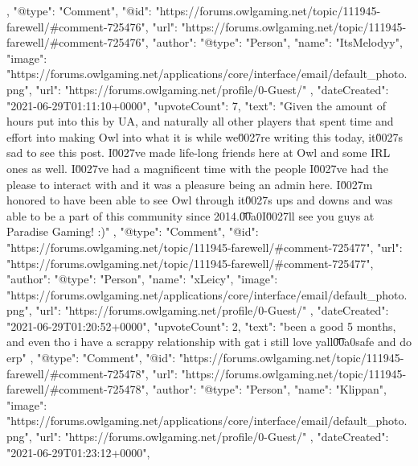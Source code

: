 {{        },
        {
            "@type": "Comment",
            "@id": "https://forums.owlgaming.net/topic/111945-farewell/#comment-725476",
            "url": "https://forums.owlgaming.net/topic/111945-farewell/#comment-725476",
            "author": {
                "@type": "Person",
                "name": "ItsMelodyy",
                "image": "https://forums.owlgaming.net/applications/core/interface/email/default_photo.png",
                "url": "https://forums.owlgaming.net/profile/0-Guest/"
            },
            "dateCreated": "2021-06-29T01:11:10+0000",
            "upvoteCount": 7,
            "text": "Given the amount of hours put into this by UA, and naturally all other players that spent time and effort into making Owl into what it is while we\u0027re writing this today, it\u0027s sad to see this post. I\u0027ve made life-long friends here at Owl and some IRL ones as well. I\u0027ve had a magnificent time with the people I\u0027ve had the please to interact with and it was a pleasure being an admin here. I\u0027m honored to have been able to see Owl through it\u0027s ups and downs and was able to be a part of this community since 2014.\n \n\n\n\t\u00a0\n \n\n\n\tHopefully I\u0027ll see you guys at Paradise Gaming! :)\n \n"
        },
        {
            "@type": "Comment",
            "@id": "https://forums.owlgaming.net/topic/111945-farewell/#comment-725477",
            "url": "https://forums.owlgaming.net/topic/111945-farewell/#comment-725477",
            "author": {
                "@type": "Person",
                "name": "xLeicy",
                "image": "https://forums.owlgaming.net/applications/core/interface/email/default_photo.png",
                "url": "https://forums.owlgaming.net/profile/0-Guest/"
            },
            "dateCreated": "2021-06-29T01:20:52+0000",
            "upvoteCount": 2,
            "text": "been a good 5 months, and even tho i have a scrappy relationship with gat i still love yall\n \n\n\n\t\u00a0\n \n\n\n\tstay safe and do erp\n \n"
        },
        {
            "@type": "Comment",
            "@id": "https://forums.owlgaming.net/topic/111945-farewell/#comment-725478",
            "url": "https://forums.owlgaming.net/topic/111945-farewell/#comment-725478",
            "author": {
                "@type": "Person",
                "name": "Klippan",
                "image": "https://forums.owlgaming.net/applications/core/interface/email/default_photo.png",
                "url": "https://forums.owlgaming.net/profile/0-Guest/"
            },
            "dateCreated": "2021-06-29T01:23:12+0000",
}}
